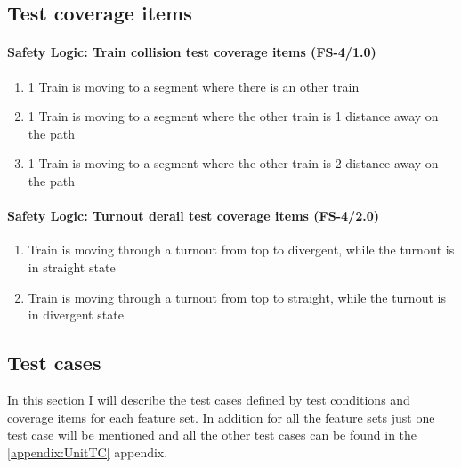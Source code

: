 \subsection{Test coverage items}

\paragraph{Safety Logic: Train collision test coverage items (FS-4/1.0)}
\begin{enumerate}[label=FS-5/1.0-\arabic*, leftmargin=*, format=\small]
	\item 1 Train is moving to a segment where there is an other train
	\item 1 Train is moving to a segment where the other train is 1 distance away on the path
	\item 1 Train is moving to a segment where the other train is 2 distance away on the path
\end{enumerate}
\paragraph{Safety Logic: Turnout derail test coverage items (FS-4/2.0)}
\begin{enumerate}[label=FS-5/2.0-\arabic*, leftmargin=*, format=\small]
	\item Train is moving through a turnout from top to divergent, while the turnout is in straight state
	\item Train is moving through a turnout from top to straight, while the turnout is in divergent state
\end{enumerate}

\subsection{Test cases}\label{section:UnitTestCases}
In this section I will describe the test cases defined by test conditions and coverage items for each feature set. In addition for all the feature sets just one test case will be mentioned and all the other test cases can be found in the \ref{appendix:UnitTC} appendix.
